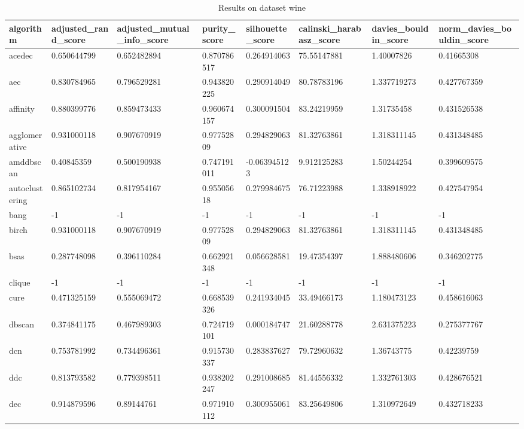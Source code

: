 \begin{table}[H]
\centering
\caption{Results on dataset wine}
\label{S71_Table}
\begin{tabular}{|l|l|l|l|l|l|l|l|}
\hline
algorithm & adjusted\_rand\_score & adjusted\_mutual\_info\_score & purity\_score & silhouette\_score & calinski\_harabasz\_score & davies\_bouldin\_score & norm\_davies\_bouldin\_score \\
\hline
acedec & 0.650644799 & 0.652482894 & 0.870786517 & 0.264914063 & 75.55147881 & 1.40007826 & 0.41665308 \\
\hline
aec & 0.830784965 & 0.796529281 & 0.943820225 & 0.290914049 & 80.78783196 & 1.337719273 & 0.427767359 \\
\hline
affinity & 0.880399776 & 0.859473433 & 0.960674157 & 0.300091504 & 83.24219959 & 1.31735458 & 0.431526538 \\
\hline
agglomerative & 0.931000118 & 0.907670919 & 0.97752809 & 0.294829063 & 81.32763861 & 1.318311145 & 0.431348485 \\
\hline
amddbscan & 0.40845359 & 0.500190938 & 0.747191011 & -0.063945123 & 9.912125283 & 1.50244254 & 0.399609575 \\
\hline
autoclustering & 0.865102734 & 0.817954167 & 0.95505618 & 0.279984675 & 76.71223988 & 1.338918922 & 0.427547954 \\
\hline
bang & -1 & -1 & -1 & -1 & -1 & -1 & -1 \\
\hline
birch & 0.931000118 & 0.907670919 & 0.97752809 & 0.294829063 & 81.32763861 & 1.318311145 & 0.431348485 \\
\hline
bsas & 0.287748098 & 0.396110284 & 0.662921348 & 0.056628581 & 19.47354397 & 1.888480606 & 0.346202775 \\
\hline
clique & -1 & -1 & -1 & -1 & -1 & -1 & -1 \\
\hline
cure & 0.471325159 & 0.555069472 & 0.668539326 & 0.241934045 & 33.49466173 & 1.180473123 & 0.458616063 \\
\hline
dbscan & 0.374841175 & 0.467989303 & 0.724719101 & 0.000184747 & 21.60288778 & 2.631375223 & 0.275377767 \\
\hline
dcn & 0.753781992 & 0.734496361 & 0.915730337 & 0.283837627 & 79.72960632 & 1.36743775 & 0.42239759 \\
\hline
ddc & 0.813793582 & 0.779398511 & 0.938202247 & 0.291008685 & 81.44556332 & 1.332761303 & 0.428676521 \\
\hline
dec & 0.914879596 & 0.89144761 & 0.971910112 & 0.300955061 & 83.25649806 & 1.310972649 & 0.432718233 \\

\end{tabular}
\end{table}
